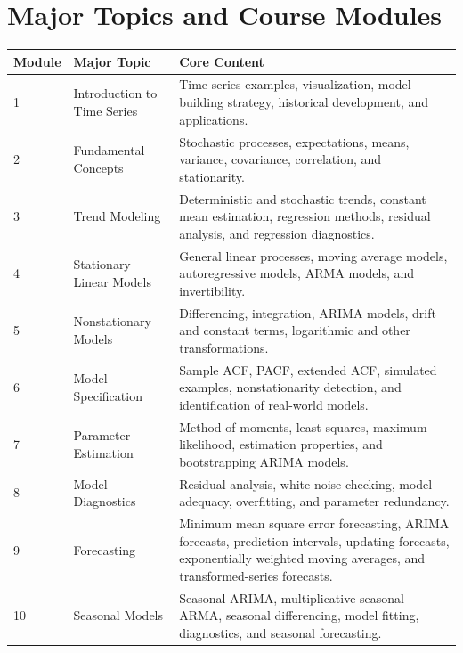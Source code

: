 \documentclass[11pt]{article}
\begin{document}
\section{Major Topics and Course Modules}

\begin{longtable}{p{} p{} p{}}
\toprule
\textbf{Module} & \textbf{Major Topic} & \textbf{Core Content} \\
\midrule
\endhead

1 & Introduction to Time Series & Time series examples, visualization, model-building strategy, historical development, and applications. \\

2 & Fundamental Concepts & Stochastic processes, expectations, means, variance, covariance, correlation, and stationarity. \\

3 & Trend Modeling & Deterministic and stochastic trends, constant mean estimation, regression methods, residual analysis, and regression diagnostics. \\

4 & Stationary Linear Models & General linear processes, moving average models, autoregressive models, ARMA models, and invertibility. \\

5 & Nonstationary Models & Differencing, integration, ARIMA models, drift and constant terms, logarithmic and other transformations. \\

6 & Model Specification & Sample ACF, PACF, extended ACF, simulated examples, nonstationarity detection, and identification of real-world models. \\

7 & Parameter Estimation & Method of moments, least squares, maximum likelihood, estimation properties, and bootstrapping ARIMA models. \\

8 & Model Diagnostics & Residual analysis, white-noise checking, model adequacy, overfitting, and parameter redundancy. \\

9 & Forecasting & Minimum mean square error forecasting, ARIMA forecasts, prediction intervals, updating forecasts, exponentially weighted moving averages, and transformed-series forecasts. \\

10 & Seasonal Models & Seasonal ARIMA, multiplicative seasonal ARMA, seasonal differencing, model fitting, diagnostics, and seasonal forecasting. \\


\end{longtable}
\end{document}
